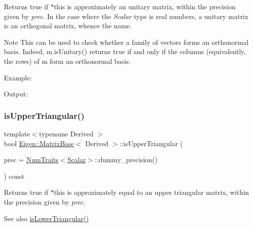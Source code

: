 \begin{DoxyReturn}{Returns}
true if $\ast$this is approximately an unitary matrix, within the precision given by {\itshape prec}. In the case where the {\itshape Scalar} type is real numbers, a unitary matrix is an orthogonal matrix, whence the name.
\end{DoxyReturn}
\begin{DoxyNote}{Note}
This can be used to check whether a family of vectors forms an orthonormal basis. Indeed, {\ttfamily m.\+is\+Unitary()} returns true if and only if the columns (equivalently, the rows) of m form an orthonormal basis.
\end{DoxyNote}
Example\+: 
\begin{DoxyCodeInclude}{0}
\end{DoxyCodeInclude}
 Output\+: 
\begin{DoxyVerbInclude}
\end{DoxyVerbInclude}
 \mbox{\label{class_eigen_1_1_matrix_base_aae3ec1660bb4ac584220481c54ab4a64}} 
\subsubsection{\texorpdfstring{isUpperTriangular()}{isUpperTriangular()}}
{\footnotesize\ttfamily template$<$typename Derived $>$ \\
bool \mbox{\hyperlink{class_eigen_1_1_matrix_base}{Eigen\+::\+Matrix\+Base}}$<$ Derived $>$\+::is\+Upper\+Triangular (\begin{DoxyParamCaption}\item[{const Real\+Scalar \&}]{prec = {\ttfamily \mbox{\hyperlink{struct_eigen_1_1_num_traits}{Num\+Traits}}$<$\mbox{\hyperlink{class_eigen_1_1_dense_base_a5feed465b3a8e60c47e73ecce83e39a2}{Scalar}}$>$\+:\+:dummy\+\_\+precision()} }\end{DoxyParamCaption}) const}

\begin{DoxyReturn}{Returns}
true if $\ast$this is approximately equal to an upper triangular matrix, within the precision given by {\itshape prec}.
\end{DoxyReturn}
\begin{DoxySeeAlso}{See also}
\mbox{\hyperlink{class_eigen_1_1_matrix_base_a1e96c42d79a56f0a6ade30ce031e17eb}{is\+Lower\+Triangular()}} 
\end{DoxySeeAlso}
\mbox{\label{class_eigen_1_1_matrix_base_a5745dca9c54390633b434e54a1d1eedd}} 
